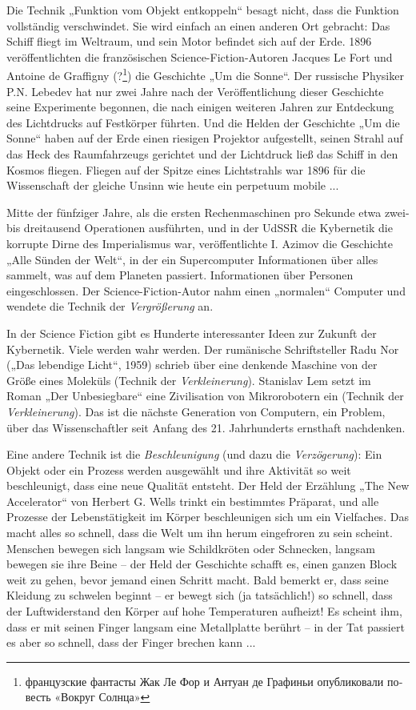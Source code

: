 \documentclass[11pt,a4paper]{article}
\begin{document}
Die Technik „Funktion vom Objekt entkoppeln“ besagt nicht, dass die Funktion
vollständig verschwindet. Sie wird einfach an einen anderen Ort gebracht: Das
Schiff fliegt im Weltraum, und sein Motor befindet sich auf der Erde.  1896
veröffentlichten die französischen Science-Fiction-Autoren Jacques Le Fort und
Antoine de Graffigny (?\footnote{\foreignlanguage{russian}{французские
    фантасты Жак Ле Фор и Антуан де Графиньи опубликовали повесть «Вокруг
    Солнца»}}) die Geschichte „Um die Sonne“. Der russische Physiker
P.N. Lebedev hat nur zwei Jahre nach der Veröffentlichung dieser Geschichte
seine Experimente begonnen, die nach einigen weiteren Jahren zur Entdeckung
des Lichtdrucks auf Festkörper führten. Und die Helden der Geschichte „Um die
Sonne“ haben auf der Erde einen riesigen Projektor aufgestellt, seinen Strahl
auf das Heck des Raumfahrzeugs gerichtet und der Lichtdruck ließ das Schiff in
den Kosmos fliegen. Fliegen auf der Spitze eines Lichtstrahls war 1896 für die
Wissenschaft der gleiche Unsinn wie heute ein perpetuum mobile ...

Mitte der fünfziger Jahre, als die ersten Rechenmaschinen pro Sekunde etwa
zwei- bis dreitausend Operationen ausführten, und in der UdSSR die Kybernetik
die korrupte Dirne des Imperialismus war, veröffentlichte I. Azimov die
Geschichte „Alle Sünden der Welt“, in der ein Supercomputer Informationen über
alles sammelt, was auf dem Planeten passiert.  Informationen über Personen
eingeschlossen. Der Science-Fiction-Autor nahm einen „normalen“ Computer und
wendete die Technik der \emph{Vergrößerung} an.

In der Science Fiction gibt es Hunderte interessanter Ideen zur Zukunft der
Kybernetik. Viele werden wahr werden. Der rumänische Schriftsteller Radu Nor
(„Das lebendige Licht“, 1959) schrieb über eine denkende Maschine von der
Größe eines Moleküls (Technik der \emph{Verkleinerung}). Stanislav Lem setzt
im Roman „Der Unbesiegbare“ eine Zivilisation von Mikrorobotern ein (Technik
der \emph{Verkleinerung}). Das ist die nächste Generation von Computern, ein
Problem, über das Wissenschaftler seit Anfang des 21. Jahrhunderts ernsthaft
nachdenken.

Eine andere Technik ist die \emph{Beschleunigung} (und dazu die
\emph{Verzögerung}): Ein Objekt oder ein Prozess werden ausgewählt und ihre
Aktivität so weit beschleunigt, dass eine neue Qualität entsteht. Der Held der
Erzählung „The New Accelerator“ von Herbert G. Wells trinkt ein bestimmtes
Präparat, und alle Prozesse der Lebenstätigkeit im Körper beschleunigen sich
um ein Vielfaches.  Das macht alles so schnell, dass die Welt um ihn herum
eingefroren zu sein scheint. Menschen bewegen sich langsam wie Schildkröten
oder Schnecken, langsam bewegen sie ihre Beine -- der Held der Geschichte
schafft es, einen ganzen Block weit zu gehen, bevor jemand einen Schritt
macht. Bald bemerkt er, dass seine Kleidung zu schwelen beginnt -- er bewegt
sich (ja tatsächlich!) so schnell, dass der Luftwiderstand den Körper auf hohe
Temperaturen aufheizt! Es scheint ihm, dass er mit seinen Finger langsam eine
Metallplatte berührt -- in der Tat passiert es aber so schnell, dass der Finger
brechen kann ...
\end{document}
